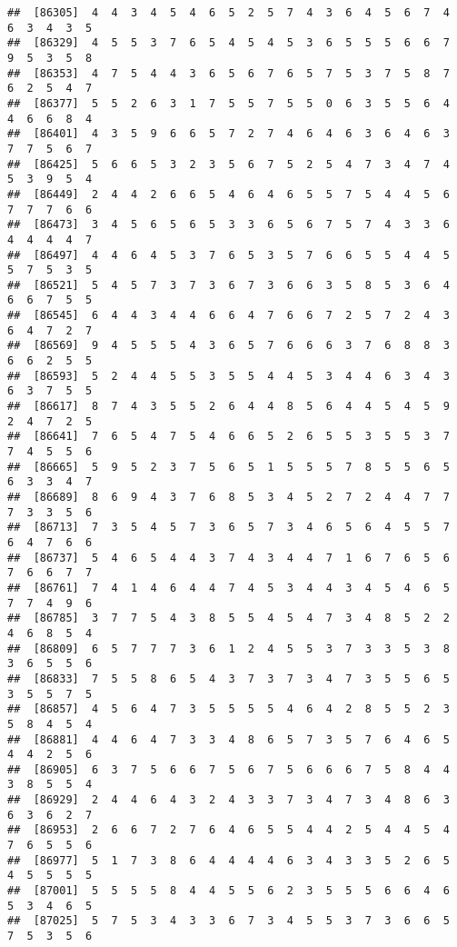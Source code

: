 \documentclass[
]{book}
\begin{document}
\begin{verbatim}
##  [86305]  4  4  3  4  5  4  6  5  2  5  7  4  3  6  4  5  6  7  4  6  3  4  3  5
##  [86329]  4  5  5  3  7  6  5  4  5  4  5  3  6  5  5  5  6  6  7  9  5  3  5  8
##  [86353]  4  7  5  4  4  3  6  5  6  7  6  5  7  5  3  7  5  8  7  6  2  5  4  7
##  [86377]  5  5  2  6  3  1  7  5  5  7  5  5  0  6  3  5  5  6  4  4  6  6  8  4
##  [86401]  4  3  5  9  6  6  5  7  2  7  4  6  4  6  3  6  4  6  3  7  7  5  6  7
##  [86425]  5  6  6  5  3  2  3  5  6  7  5  2  5  4  7  3  4  7  4  5  3  9  5  4
##  [86449]  2  4  4  2  6  6  5  4  6  4  6  5  5  7  5  4  4  5  6  7  7  7  6  6
##  [86473]  3  4  5  6  5  6  5  3  3  6  5  6  7  5  7  4  3  3  6  4  4  4  4  7
##  [86497]  4  4  6  4  5  3  7  6  5  3  5  7  6  6  5  5  4  4  5  5  7  5  3  5
##  [86521]  5  4  5  7  3  7  3  6  7  3  6  6  3  5  8  5  3  6  4  6  6  7  5  5
##  [86545]  6  4  4  3  4  4  6  6  4  7  6  6  7  2  5  7  2  4  3  6  4  7  2  7
##  [86569]  9  4  5  5  5  4  3  6  5  7  6  6  6  3  7  6  8  8  3  6  6  2  5  5
##  [86593]  5  2  4  4  5  5  3  5  5  4  4  5  3  4  4  6  3  4  3  6  3  7  5  5
##  [86617]  8  7  4  3  5  5  2  6  4  4  8  5  6  4  4  5  4  5  9  2  4  7  2  5
##  [86641]  7  6  5  4  7  5  4  6  6  5  2  6  5  5  3  5  5  3  7  7  4  5  5  6
##  [86665]  5  9  5  2  3  7  5  6  5  1  5  5  5  7  8  5  5  6  5  6  3  3  4  7
##  [86689]  8  6  9  4  3  7  6  8  5  3  4  5  2  7  2  4  4  7  7  7  3  3  5  6
##  [86713]  7  3  5  4  5  7  3  6  5  7  3  4  6  5  6  4  5  5  7  6  4  7  6  6
##  [86737]  5  4  6  5  4  4  3  7  4  3  4  4  7  1  6  7  6  5  6  7  6  6  7  7
##  [86761]  7  4  1  4  6  4  4  7  4  5  3  4  4  3  4  5  4  6  5  7  7  4  9  6
##  [86785]  3  7  7  5  4  3  8  5  5  4  5  4  7  3  4  8  5  2  2  4  6  8  5  4
##  [86809]  6  5  7  7  7  3  6  1  2  4  5  5  3  7  3  3  5  3  8  3  6  5  5  6
##  [86833]  7  5  5  8  6  5  4  3  7  3  7  3  4  7  3  5  5  6  5  3  5  5  7  5
##  [86857]  4  5  6  4  7  3  5  5  5  5  4  6  4  2  8  5  5  2  3  5  8  4  5  4
##  [86881]  4  4  6  4  7  3  3  4  8  6  5  7  3  5  7  6  4  6  5  4  4  2  5  6
##  [86905]  6  3  7  5  6  6  7  5  6  7  5  6  6  6  7  5  8  4  4  3  8  5  5  4
##  [86929]  2  4  4  6  4  3  2  4  3  3  7  3  4  7  3  4  8  6  3  6  3  6  2  7
##  [86953]  2  6  6  7  2  7  6  4  6  5  5  4  4  2  5  4  4  5  4  7  6  5  5  6
##  [86977]  5  1  7  3  8  6  4  4  4  4  6  3  4  3  3  5  2  6  5  4  5  5  5  5
##  [87001]  5  5  5  5  8  4  4  5  5  6  2  3  5  5  5  6  6  4  6  5  3  4  6  5
##  [87025]  5  7  5  3  4  3  3  6  7  3  4  5  5  3  7  3  6  6  5  7  5  3  5  6

\end{verbatim}
\end{document}
